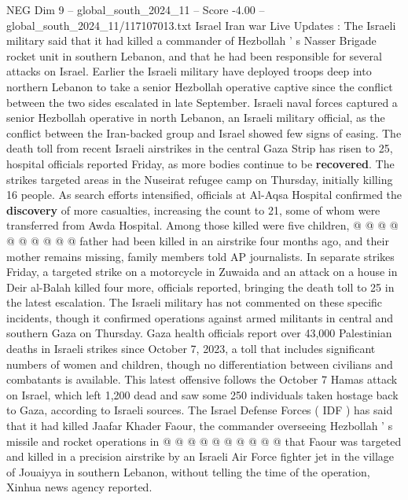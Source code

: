 \begin{textsample}{NEG Dim 9 – global\_south\_2024\_11 – Score -4.00 – global\_south\_2024\_11/117107013.txt}  \label{ex:f9_neg_414}
Israel Iran war Live Updates : The Israeli military said that it had killed a commander of Hezbollah ' s Nasser Brigade rocket unit in southern Lebanon, and that he had been responsible for several attacks on Israel.
Earlier the Israeli military have deployed troops deep into northern Lebanon to take a senior Hezbollah operative captive since the conflict between the two sides escalated in late September.
Israeli naval forces captured a senior Hezbollah operative in north Lebanon, an Israeli military official, as the conflict between the Iran-backed group and Israel showed few signs of easing.
The death toll from recent Israeli airstrikes in the central Gaza Strip has risen to 25, hospital officials reported Friday, as more bodies continue to be \textbf{recovered}.
The strikes targeted areas in the Nuseirat refugee camp on Thursday, initially killing 16 people.
As search efforts intensified, officials at Al-Aqsa Hospital confirmed the \textbf{discovery} of more casualties, increasing the count to 21, some of whom were transferred from Awda Hospital.
Among those killed were five children, @ @ @ @ @ @ @ @ @ @ father had been killed in an airstrike four months ago, and their mother remains missing, family members told AP journalists.
In separate strikes Friday, a targeted strike on a motorcycle in Zuwaida and an attack on a house in Deir al-Balah killed four more, officials reported, bringing the death toll to 25 in the latest escalation.
The Israeli military has not commented on these specific incidents, though it confirmed operations against armed militants in central and southern Gaza on Thursday.
Gaza health officials report over 43,000 Palestinian deaths in Israeli strikes since October 7, 2023, a toll that includes significant numbers of women and children, though no differentiation between civilians and combatants is available.
This latest offensive follows the October 7 Hamas attack on Israel, which left 1,200 dead and saw some 250 individuals taken hostage back to Gaza, according to Israeli sources.
The Israel Defense Forces ( IDF ) has said that it had killed Jaafar Khader Faour, the commander overseeing Hezbollah ' s missile and rocket operations in @ @ @ @ @ @ @ @ @ @ that Faour was targeted and killed in a precision airstrike by an Israeli Air Force fighter jet in the village of Jouaiyya in southern Lebanon, without telling the time of the operation, Xinhua news agency reported.

\end{textsample}
